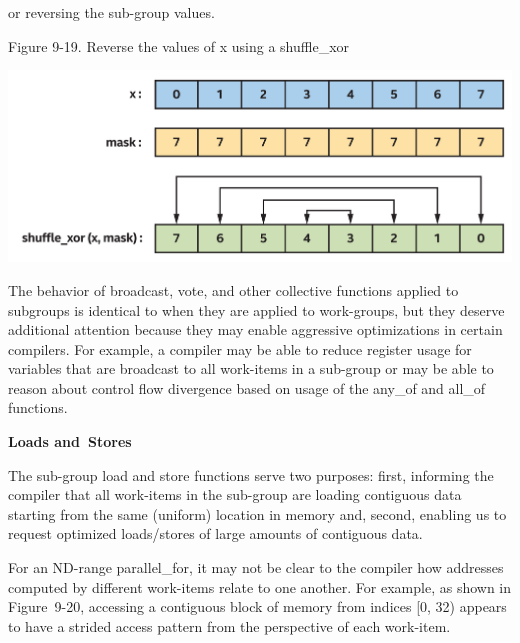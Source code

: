 or reversing the sub-group values.\par

\hspace*{\fill} \par %
Figure 9-19. Reverse the values of x using a shuffle\_xor
\begin{center}
	\includegraphics[width=1.\textwidth]{content/chapter-9/images/12}
\end{center}

\begin{tcolorbox}[colback=blue!5!white,colframe=blue!75!black, title=SUB-GROUP OPTIMIZATIONS USING BROADCAST VOTE AND COLLECTIVES]
The behavior of broadcast, vote, and other collective functions applied to subgroups is identical to when they are applied to work-groups, but they deserve additional attention because they may enable aggressive optimizations in certain compilers. For example, a compiler may be able to reduce register usage for variables that are broadcast to all work-items in a sub-group or may be able to reason about control flow divergence based on usage of the any\_of and all\_of functions.
\end{tcolorbox}

\hspace*{\fill} \par %
\textbf{Loads and Stores}

The sub-group load and store functions serve two purposes: first, informing the compiler that all work-items in the sub-group are loading contiguous data starting from the same (uniform) location in memory and, second, enabling us to request optimized loads/stores of large amounts of contiguous data.\par

For an ND-range parallel\_for, it may not be clear to the compiler how addresses computed by different work-items relate to one another. For example, as shown in Figure 9-20, accessing a contiguous block of memory from indices [0, 32) appears to have a strided access pattern from the perspective of each work-item.\par

